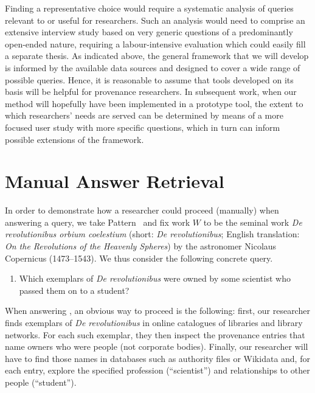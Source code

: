Finding a representative choice would require a systematic analysis
of queries relevant to or useful for researchers.
Such an analysis would need to comprise an extensive interview study
based on very generic questions of a predominantly open-ended nature,
requiring a labour-intensive evaluation which could easily fill a separate thesis.
As indicated above, the general framework that we will develop
is informed by the available data sources
and designed to cover a wide range of possible queries.
Hence,
it is reasonable to assume that tools developed on its basis will be helpful for provenance researchers.
In subsequent work, when our method will hopefully have been implemented in a prototype tool,
the extent to which researchers' needs are served can be determined by means of a more focused user study
with more specific questions, which in turn can inform possible extensions of the framework.

\section{Manual Answer Retrieval}
\label{sec:manual_answering}

In order to demonstrate how a researcher could proceed (manually) when answering a query,
we take Pattern~ and fix work $W$ to be the seminal work \emph{De revolutionibus orbium coelestium}
(short: \emph{De revolutionibus}; English translation: \emph{On the Revolutions of the Heavenly Spheres}) \autocite{Kopernikus1543}
by the astronomer Nicolaus Copernicus (1473–1543).
We thus consider the following concrete query.
%
\begin{enumerate}
  \item[\exaquery{2$'$}]
    Which exemplars of \emph{De revolutionibus} were owned by some scientist who passed them on to a student?
\end{enumerate}
%
When answering , an obvious way to proceed is the following:
first, our researcher finds exemplars of \emph{De revolutionibus} 
in online catalogues of libraries and library networks. For each such exemplar, they then inspect the provenance entries
that name owners who were people (not corporate bodies). Finally, our researcher will have to find those names in databases such as
authority files or Wikidata and, for each entry, explore the specified profession (\enquote{scientist})
and relationships to other people (\enquote{student}).

